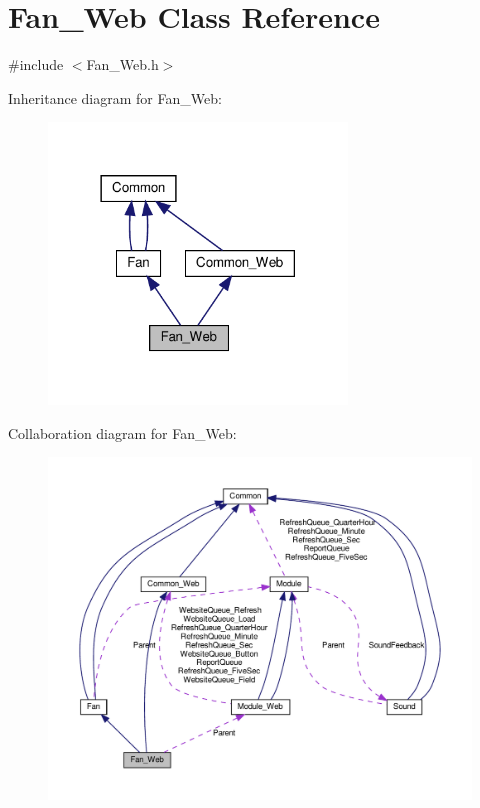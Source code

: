 \hypertarget{class_fan___web}{}\section{Fan\+\_\+\+Web Class Reference}
\label{class_fan___web}


{\ttfamily \#include $<$Fan\+\_\+\+Web.\+h$>$}



Inheritance diagram for Fan\+\_\+\+Web\+:
\nopagebreak
\begin{figure}[H]
\begin{center}
\leavevmode
\includegraphics[width=225pt]{class_fan___web__inherit__graph}
\end{center}
\end{figure}


Collaboration diagram for Fan\+\_\+\+Web\+:
\nopagebreak
\begin{figure}[H]
\begin{center}
\leavevmode
\includegraphics[width=350pt]{class_fan___web__coll__graph}
\end{center}
\end{figure}
